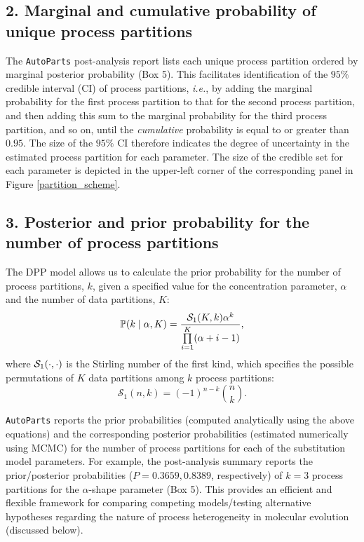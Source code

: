 \documentclass[11pt]{article}
\begin{document}
\subsection*{2. Marginal and cumulative probability of unique process partitions}
The \verb!AutoParts! post-analysis report lists each unique process partition ordered by marginal posterior probability (Box 5). 
This facilitates identification of the $95\%$ credible interval (CI) of process partitions, {\it i.e.}, by adding the marginal probability for the first process partition to that for the second process partition, and then adding this sum to the marginal probability for the third process partition, and so on, until the \emph{cumulative} probability is equal to or greater than $0.95$.
The size of the $95\%$ CI therefore indicates the degree of uncertainty in the estimated process partition for each parameter.
The size of the credible set for each parameter is depicted in the upper-left corner of the corresponding panel in Figure \ref{partition_scheme}. 


\bigskip
\subsection*{3. Posterior and prior probability for the number of process partitions}
The DPP model allows us to calculate the prior probability for the number of process partitions, $k$, given a specified value for the concentration parameter, $\alpha$ and the number of data partitions, $K$:
\begin{align} \label{eq:P(k)}
\mathbb{P}(k \mid \alpha, K) = \frac{{\cal S}_1(K,k) \alpha^k}{\prod\limits^{K}_{i=1}(\alpha + i - 1)},
\end{align}
where ${\cal S}_1(\cdot,\cdot)$ is the Stirling number of the first kind, which specifies the possible permutations of $K$ data partitions among $k$ process partitions:
$$
\mathcal{S}_1(n, k) = (-1)^{n-k} {n \choose k}.
$$

\verb!AutoParts! reports the prior probabilities (computed analytically using the above equations) and the corresponding posterior probabilities (estimated numerically using MCMC) for the number of process partitions for each of the substitution model parameters.
For example, the post-analysis summary reports the prior/posterior probabilities ($P = 0.3659, 0.8389$, respectively) of $k = 3$ process partitions for the $\alpha$-shape parameter (Box 5). 
This provides an efficient and flexible framework for comparing competing models/testing alternative hypotheses regarding the nature of process heterogeneity in molecular evolution (discussed below).
\end{document}
